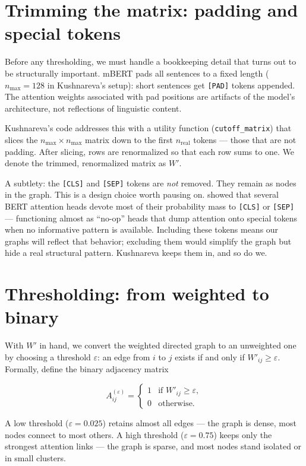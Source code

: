 \section{Trimming the matrix: padding and special tokens}
\label{sec:trimming}

Before any thresholding, we must handle a bookkeeping detail that turns out to
be structurally important.  mBERT pads all sentences to a fixed length
($n_{\max} = 128$ in Kushnareva's setup): short sentences get \texttt{[PAD]}
tokens appended.  The attention weights associated with pad positions are
artifacts of the model's architecture, not reflections of linguistic content.

Kushnareva's code addresses this with a utility function (\texttt{cutoff\_matrix})
that slices the $n_{\max} \times n_{\max}$ matrix down to the first $n_{\text{real}}$
tokens --- those that are not padding.  After slicing, rows are renormalized so
that each row sums to one.  We denote the trimmed, renormalized matrix as
$W'$.

A subtlety: the \texttt{[CLS]} and \texttt{[SEP]} tokens are \emph{not} removed.
They remain as nodes in the graph.  This is a design choice worth pausing on.
\textcite{clark2019} showed that several BERT attention heads devote most of
their probability mass to \texttt{[CLS]} or \texttt{[SEP]} --- functioning
almost as ``no-op'' heads that dump attention onto special tokens when no
informative pattern is available.  Including these tokens means our graphs
will reflect that behavior; excluding them would simplify the graph but hide
a real structural pattern.  Kushnareva keeps them in, and so do we.

\section{Thresholding: from weighted to binary}
\label{sec:thresholding}

With $W'$ in hand, we convert the weighted directed graph to an unweighted
one by choosing a threshold $\varepsilon$: an edge from $i$ to $j$ exists if
and only if $W'_{ij} \geq \varepsilon$.  Formally, define the binary
adjacency matrix

\[
  A^{(\varepsilon)}_{ij} =
  \begin{cases}
    1 & \text{if } W'_{ij} \geq \varepsilon, \\
    0 & \text{otherwise.}
  \end{cases}
\]

A low threshold ($\varepsilon = 0.025$) retains almost all edges --- the graph
is dense, most nodes connect to most others.  A high threshold
($\varepsilon = 0.75$) keeps only the strongest attention links --- the graph
is sparse, and most nodes stand isolated or in small clusters.

